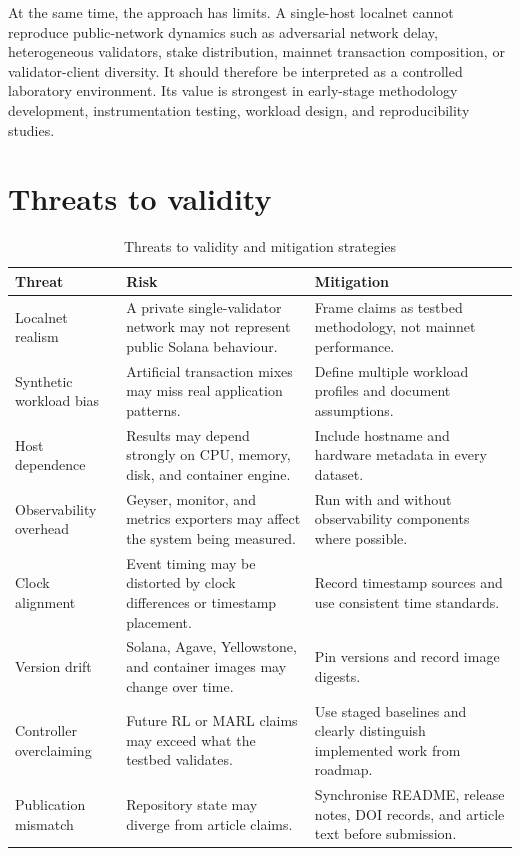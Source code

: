 \documentclass[11pt,a4paper]{article}
\begin{document}
At the same time, the approach has limits. A single-host localnet cannot reproduce public-network dynamics such as adversarial network delay, heterogeneous validators, stake distribution, mainnet transaction composition, or validator-client diversity. It should therefore be interpreted as a controlled laboratory environment. Its value is strongest in early-stage methodology development, instrumentation testing, workload design, and reproducibility studies.

\section{Threats to validity}
\label{sec:validity}

\begin{table}[H]
\centering
\caption{Threats to validity and mitigation strategies}
\label{tab:validity}
\begin{tabularx}{\textwidth}{L{3.2cm}Y Y}
\toprule
\textbf{Threat} & \textbf{Risk} & \textbf{Mitigation} \\
\midrule
Localnet realism & A private single-validator network may not represent public Solana behaviour. & Frame claims as testbed methodology, not mainnet performance. \\
Synthetic workload bias & Artificial transaction mixes may miss real application patterns. & Define multiple workload profiles and document assumptions. \\
Host dependence & Results may depend strongly on CPU, memory, disk, and container engine. & Include hostname and hardware metadata in every dataset. \\
Observability overhead & Geyser, monitor, and metrics exporters may affect the system being measured. & Run with and without observability components where possible. \\
Clock alignment & Event timing may be distorted by clock differences or timestamp placement. & Record timestamp sources and use consistent time standards. \\
Version drift & Solana, Agave, Yellowstone, and container images may change over time. & Pin versions and record image digests. \\
Controller overclaiming & Future RL or MARL claims may exceed what the testbed validates. & Use staged baselines and clearly distinguish implemented work from roadmap. \\
Publication mismatch & Repository state may diverge from article claims. & Synchronise README, release notes, DOI records, and article text before submission. \\
\bottomrule
\end{tabularx}
\end{table}
\end{document}
